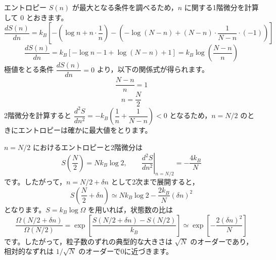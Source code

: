 \begin{solutionparts}
エントロピー $S(n)$ が最大となる条件を調べるため，$n$ に関する1階微分を計算して 0 とおきます。
\begin{equation*}
\frac{dS(n)}{dn} = k_B \left[ - \left( \log n + n \cdot \frac{1}{n} \right) - \left( - \log (N-n) + (N-n) \cdot \frac{1}{N-n} \cdot (-1) \right) \right]
\end{equation*}
\begin{equation*}
\frac{dS(n)}{dn} = k_B \left[ - \log n - 1 + \log (N-n) + 1 \right] = k_B \log \left( \frac{N-n}{n} \right)
\end{equation*}
極値をとる条件 $\dfrac{dS(n)}{dn} = 0$ より，以下の関係式が得られます。
\begin{equation*}
\frac{N-n}{n} = 1
\end{equation*}
\begin{equation*}
n = \frac{N}{2}
\end{equation*}
2階微分を計算すると $\dfrac{d^2S}{dn^2} = -k_B \left( \dfrac{1}{n} + \dfrac{1}{N-n} \right) < 0$ となるため，$n = N/2$ のときにエントロピーは確かに最大値をとります。
\par
$n=N/2$ におけるエントロピーと2階微分は
\begin{equation*}
S\left(\frac{N}{2}\right)=Nk_B\log 2,\qquad
\left.\frac{d^2S}{dn^2}\right|_{n=N/2}=-\frac{4k_B}{N}
\end{equation*}
です。したがって，$n=N/2+\delta n$ として2次まで展開すると，
\begin{equation*}
S\left(\frac{N}{2}+\delta n\right)
\simeq Nk_B\log 2-\frac{2k_B}{N}(\delta n)^2
\end{equation*}
となります。$S=k_B\log\Omega$ を用いれば，状態数の比は
\begin{equation*}
\frac{\Omega(N/2+\delta n)}{\Omega(N/2)}
=\exp\left[\frac{S(N/2+\delta n)-S(N/2)}{k_B}\right]
\simeq \exp\left[-\frac{2(\delta n)^2}{N}\right]
\end{equation*}
です。したがって，粒子数のずれの典型的な大きさは $\sqrt{N}$ のオーダーであり，相対的なずれは $1/\sqrt{N}$ のオーダーで0に近づきます。

\end{solutionparts}
